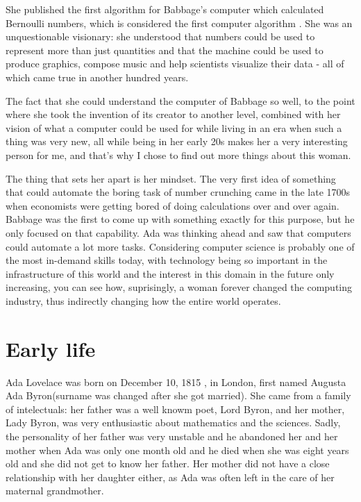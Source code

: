 \documentclass{article}
\begin{document}
\vspace{0.3cm}

She published the first algorithm for Babbage's computer which calculated Bernoulli numbers, which is considered the first computer algorithm \cite{MentalFloss}. She was an unquestionable visionary: she understood that numbers could be used to represent more than just quantities and that the machine could be used to produce graphics, compose music and help scientists visualize their data - all of which came true in another hundred years.

\vspace{0.3cm}

The fact that she could understand the computer of Babbage so well, to the point where she took the invention of its creator to another level, combined with her vision of what a computer could be used for while living in an era when such a thing was very new, all while being in her early 20s makes her a very interesting person for me, and that's why I chose to find out more things about this woman.

\vspace{0.3cm}

The thing that sets her apart is her mindset. The very first idea of something that could automate the boring task of number crunching came in the late 1700s when economists were getting bored of doing calculations over and over again. Babbage was the first to come up with something exactly for this purpose, but he only focused on that capability. Ada was thinking ahead and saw that computers could automate a lot more tasks. Considering computer science is probably one of the most in-demand skills today, with technology being so important in the infrastructure of this world and the interest in this domain in the future only increasing, you can see how, suprisingly, a woman forever changed the computing industry, thus indirectly changing how the entire world operates.

\newpage

\section{Early life}

Ada Lovelace was born on December 10, 1815 \cite{famousscientists}, in London, first named Augusta Ada Byron(surname was changed after she got married). She came from a family of intelectuals: her father was a well knowm poet, Lord Byron, and her mother, Lady Byron, was very enthusiastic about mathematics and the sciences. Sadly, the personality of her father was very unstable and he abandoned her and her mother when Ada was only one month old and he died when she was eight years old and she did not get to know her father. Her mother did not have a close relationship with her daughter either, as Ada was often left in the care of her maternal grandmother.
\end{document}
